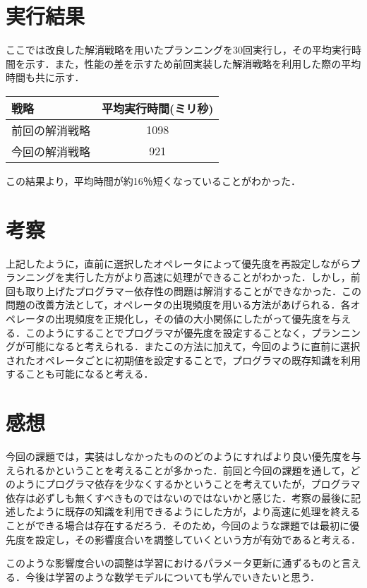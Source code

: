 \documentclass[a4j]{jarticle}
\begin{document}
\section{実行結果}
ここでは改良した解消戦略を用いたプランニングを30回実行し，その平均実行時間を示す．また，性能の差を示すため前回実装した解消戦略を利用した際の平均時間も共に示す．
\begin{table}[H]
\begin{center}
\begin{tabular}{|l|c|}
\hline
戦略 & 平均実行時間(ミリ秒) \\ 
\hline
前回の解消戦略 & 1098 \\ \hline
今回の解消戦略 & 921 \\ \hline
\end{tabular}
\end{center}
\end{table}
この結果より，平均時間が約16％短くなっていることがわかった．
\section{考察}
上記したように，直前に選択したオペレータによって優先度を再設定しながらプランニングを実行した方がより高速に処理ができることがわかった．しかし，前回も取り上げたプログラマー依存性の問題は解消することができなかった．この問題の改善方法として，オペレータの出現頻度を用いる方法があげられる．各オペレータの出現頻度を正規化し，その値の大小関係にしたがって優先度を与える．このようにすることでプログラマが優先度を設定することなく，プランニングが可能になると考えられる．またこの方法に加えて，今回のように直前に選択されたオペレータごとに初期値を設定することで，プログラマの既存知識を利用することも可能になると考える．
\section{感想}
今回の課題では，実装はしなかったもののどのようにすればより良い優先度を与えられるかということを考えることが多かった．前回と今回の課題を通して，どのようにプログラマ依存を少なくするかということを考えていたが，プログラマ依存は必ずしも無くすべきものではないのではないかと感じた．考察の最後に記述したように既存の知識を利用できるようにした方が，より高速に処理を終えることができる場合は存在するだろう．そのため，今回のような課題では最初に優先度を設定し，その影響度合いを調整していくという方が有効であると考える．

このような影響度合いの調整は学習におけるパラメータ更新に通ずるものと言える．今後は学習のような数学モデルについても学んでいきたいと思う．
\end{document}

